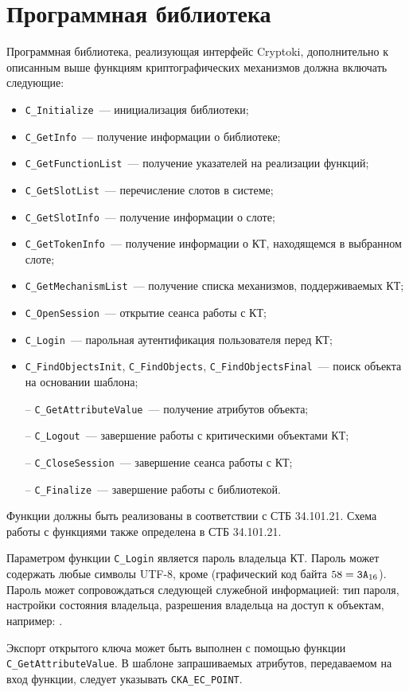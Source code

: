 \section{Программная библиотека}\label{CRYPTOKI.Lib}

Программная библиотека, реализующая интерфейс Cryptoki,
дополнительно к описанным выше функциям криптографических механизмов 
должна включать следующие:
\begin{itemize}
\item
\verb|C_Initialize|~--- инициализация библиотеки;
\item
\verb|C_GetInfo|~--- получение информации о библиотеке;
\item
\verb|C_GetFunctionList|~--- получение указателей на реализации функций;
\item
\verb|C_GetSlotList|~--- перечисление слотов в системе;
\item
\verb|C_GetSlotInfo|~--- получение информации о слоте;
\item
\verb|C_GetTokenInfo|~--- получение информации о КТ, находящемся в 
выбранном слоте;
\item
\verb|C_GetMechanismList|~--- 
получение списка механизмов, поддерживаемых КТ;
\item
\verb|C_OpenSession|~--- открытие сеанса работы с КТ;
\item
\verb|C_Login|~--- парольная аутентификация пользователя перед КТ;
\item
\verb|C_FindObjectsInit|, \verb|C_FindObjects|, 
\verb|C_FindObjectsFinal|~---
поиск объекта на основании шаблона;
\item[--]
\verb|C_GetAttributeValue|~--- получение атрибутов объекта;
\item[--]
\verb|C_Logout|~--- завершение работы с критическими объектами КТ;
\item[--]
\verb|C_CloseSession|~--- завершение сеанса работы с КТ;
\item[--]
\verb|C_Finalize|~--- завершение работы с библиотекой.
\end{itemize}

Функции должны быть реализованы в соответствии с СТБ 34.101.21.
Схема работы с функциями также определена в СТБ 34.101.21.

Параметром функции \verb|C_Login| является пароль владельца КТ.
Пароль может содержать любые символы UTF-8, кроме \str{:} 
(графический код байта $58=\texttt{3A}_{16}$). Пароль может сопровождаться 
следующей служебной информацией: тип пароля, настройки состояния владельца, 
разрешения владельца на доступ к объектам, например: . 

Экспорт открытого ключа может быть выполнен с помощью функции 
\verb|C_GetAttributeValue|. В шаблоне запрашиваемых атрибутов, 
передаваемом на вход функции, следует указывать \verb|CKA_EC_POINT|.

